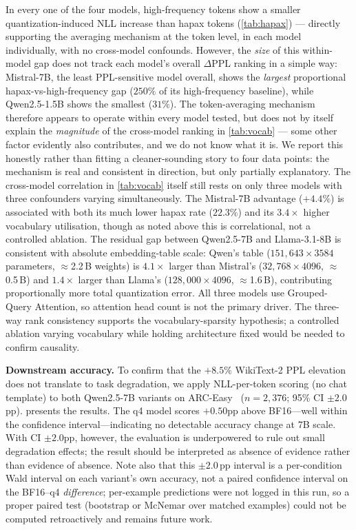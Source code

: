 \documentclass[10pt,twocolumn]{article}
\begin{document}
In every one of the four models, high-frequency tokens show a smaller
quantization-induced NLL increase than hapax tokens (\cref{tab:hapax}) ---
directly supporting the averaging mechanism at the token level, in each
model individually, with no cross-model confounds.  However, the
\emph{size} of this within-model gap does not track each model's overall
$\Delta$PPL ranking in a simple way: Mistral-7B, the least PPL-sensitive
model overall, shows the \emph{largest} proportional hapax-vs-high-frequency
gap ($250\%$ of its high-frequency baseline), while Qwen2.5-1.5B shows the
smallest ($31\%$).  The token-averaging mechanism therefore appears to
operate within every model tested, but does not by itself explain the
\emph{magnitude} of the cross-model ranking in \cref{tab:vocab} --- some
other factor evidently also contributes, and we do not know what it is.  We
report this honestly rather than fitting a cleaner-sounding story to four
data points: the mechanism is real and consistent in direction, but only
partially explanatory.  The cross-model correlation in \cref{tab:vocab}
itself still rests on only three models with three confounders varying
simultaneously.
The Mistral-7B advantage ($+4.4\%$) is associated with both its much lower
hapax rate ($22.3\%$) and its $3.4\times$ higher vocabulary utilisation,
though as noted above this is correlational, not a controlled ablation.
The residual gap between Qwen2.5-7B and Llama-3.1-8B is consistent with
absolute embedding-table scale: Qwen's table
($151{,}643\times3584$ parameters, $\approx$2.2\,B weights) is $4.1\times$
larger than Mistral's ($32{,}768\times4096$, $\approx$0.5\,B) and
$1.4\times$ larger than Llama's ($128{,}000\times4096$, $\approx$1.6\,B),
contributing proportionally more total quantization error.
All three models use Grouped-Query Attention, so attention head count is
not the primary driver.  The three-way rank consistency supports the
vocabulary-sparsity hypothesis; a controlled ablation varying vocabulary
while holding architecture fixed would be needed to confirm causality.


\textbf{Downstream accuracy.}  To confirm that the $+8.5\%$ WikiText-2 PPL
elevation does not translate to task degradation, we apply NLL-per-token
scoring (no chat template) to both Qwen2.5-7B variants on
ARC-Easy~\citep{clark2018arc} ($n=2{,}376$; 95\% CI $\pm2.0$pp).
 presents the results.  The q4 model scores
$+0.50$pp above BF16---well within the confidence interval---indicating no
detectable accuracy change at 7B scale.  With CI $\pm2.0$pp, however, the
evaluation is underpowered to rule out small degradation effects; the result
should be interpreted as absence of evidence rather than evidence of absence.
Note also that this $\pm2.0$\,pp interval is a per-condition Wald interval on
each variant's own accuracy, not a paired confidence interval on the
BF16--q4 \emph{difference}; per-example predictions were not logged in this
run, so a proper paired test (bootstrap or McNemar over matched examples)
could not be computed retroactively and remains future work.
\end{document}
